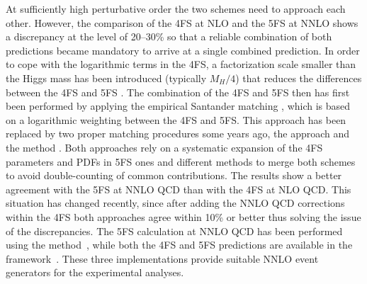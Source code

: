 \documentclass[11pt,a4paper]{article}
\begin{document}
At sufficiently high perturbative order the two schemes need to approach each other. However, the comparison of the 4FS at NLO and the 5FS at NNLO shows a discrepancy at the level of 20--30\% so that a reliable combination of both predictions became mandatory to arrive at a single combined prediction. In order to cope with the logarithmic terms in the 4FS, a factorization scale smaller than the Higgs mass has been introduced (typically $M_H/4$) that reduces the differences between the 4FS and 5FS \cite{campbell2004,Maltoni:2012pa}. The combination of the 4FS and 5FS then has first been performed by applying the empirical Santander matching \cite{harlander:2011aa}, which is based on a logarithmic weighting between the 4FS and 5FS. This approach has been replaced by two proper matching procedures some years ago, the \fonll{} approach \cite{forte:2015hba,forte:2016sja} and the \nlonnllpart{} method \cite{Bonvini:2015pxa,Bonvini:2016fgf}. Both approaches rely on a systematic expansion of the 4FS parameters and PDFs in 5FS ones and different methods to merge both schemes to avoid double-counting of common contributions. The results show a better agreement with the 5FS at NNLO QCD than with the 4FS at NLO QCD. This situation has changed recently, since after adding the NNLO QCD corrections within the 4FS both approaches agree within 10\% or better thus solving the issue of the discrepancies. The 5FS calculation at NNLO QCD has been performed using the \GENEVA{} method~\cite{Gavardi:2025zpf}, while both the 4FS and 5FS predictions are available in the \minnlo{} framework~\cite{Biello:2024pgo,Biello:2024vdh}. These three implementations provide suitable NNLO event generators for the experimental analyses.
\end{document}
